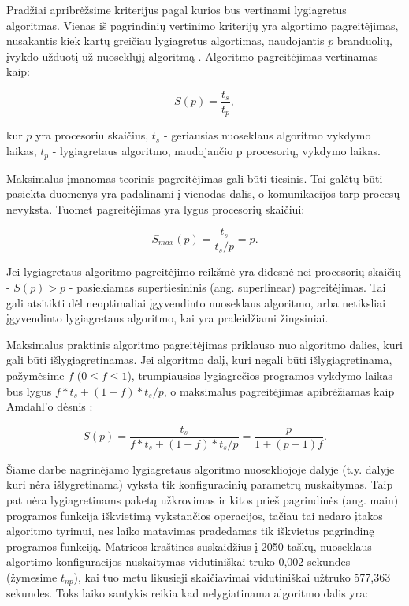 \documentclass{VUMIFPSbakalaurinis}
\begin{document}
Pradžiai apribrėžsime kriterijus pagal kurios bus vertinami lygiagretus algoritmas.
Vienas iš pagrindinių vertinimo kriterijų yra algortimo pagreitėjimas, nusakantis kiek kartų greičiau lygiagretus algortimas, naudojantis $p$ branduolių, įvykdo užduotį už nuoseklųjį algoritmą \cite{eager1989speedup}.   
Algoritmo pagreitėjimas vertinamas kaip:

\[ S(p) = \frac{t_s}{t_p} ,\]

kur $p$ yra procesoriu skaičius, $t_s$ -  geriausias nuoseklaus algoritmo vykdymo laikas, $t_p$ - lygiagretaus algoritmo, naudojančio p procesorių, vykdymo laikas. 

Maksimalus įmanomas teorinis pagreitėjimas gali būti tiesinis. 
Tai galėtų būti pasiekta duomenys yra padalinami į vienodas dalis, o komunikacijos tarp procesų nevyksta.
Tuomet pagreitėjimas yra lygus procesorių skaičiui:

\[ S_{max}(p) = \frac{t_s}{t_s/p} = p .\]

Jei lygiagretaus algoritmo pagreitėjimo reikšmė yra didesnė nei procesorių skaičių - $S(p) > p$ - pasiekiamas supertiesininis (ang. superlinear) pagreitėjimas. 
Tai gali atsitikti dėl neoptimaliai įgyvendinto nuoseklaus algoritmo, arba netiksliai įgyvendinto lygiagretaus algoritmo, kai yra praleidžiami žingsiniai.

Maksimalus praktinis algoritmo pagreitėjimas priklauso nuo algoritmo dalies, kuri gali būti išlygiagretinamas. 
Jei algoritmo dalį, kuri negali būti išlygiagretinama, pažymėsime $f$ ($0 \le f \le 1$), trumpiausias lygiagrečios programos vykdymo laikas bus lygus $f*t_s+ (1-f)*t_s/p$, o maksimalus pagreitėjimas apibrėžiamas kaip Amdahl'o dėsnis \cite{amdahl1967validity}:



\[ S(p) = \frac{t_s}{f*t_s+ (1-f)*t_s/p} = \frac{p}{1+(p-1)f} .\]


Šiame darbe nagrinėjamo lygiagretaus algoritmo nuosekliojoje dalyje (t.y. dalyje kuri nėra išlygretinama) vyksta tik konfiguracinių parametrų nuskaitymas. 
Taip pat nėra lygiagretinams paketų užkrovimas ir kitos prieš pagrindinės (ang. main) programos funkcija iškvietimą vykstančios operacijos, tačiau tai nedaro įtakos algoritmo tyrimui, nes laiko matavimas pradedamas tik iškvietus pagrindinę programos funkciją.
Matricos kraštines suskaidžius į 2050 taškų, nuoseklaus algortimo konfiguracijos nuskaitymas vidutiniškai truko 0,002 sekundes (žymesime $t_{np}$), kai tuo metu likusieji skaičiavimai vidutiniškai užtruko 577,363 sekundes.
Toks laiko santykis reikia kad nelygiatinama algoritmo dalis yra:
\end{document}
